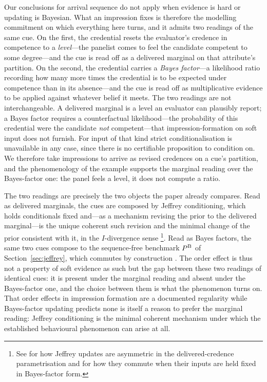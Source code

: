 Our conclusions for arrival sequence do not apply when evidence is hard or
updating is Bayesian. What an impression fixes is therefore the modelling
commitment on which everything here turns, and it admits two readings of the
same cue. On the first, the credential resets the evaluator's credence in
competence to a \emph{level}---the panelist comes to feel the candidate
competent to some degree---and the cue is read off as a delivered marginal on
that attribute's partition. On the second, the credential carries a
\emph{Bayes factor}---a likelihood ratio recording how many more times the
credential is to be expected under competence than in its absence---and the cue
is read off as multiplicative evidence to be applied against whatever belief it
meets. The two readings are not interchangeable. A delivered marginal is a
level an evaluator can plausibly report; a Bayes factor requires a counterfactual
likelihood---the probability of this credential were the candidate \emph{not}
competent---that impression-formation on soft input does not furnish. For input
of that kind strict conditionalisation is unavailable in any case, since there
is no certifiable proposition to condition on. We therefore take impressions to
arrive as revised credences on a cue's partition, and the phenomenology of the
example supports the marginal reading over the Bayes-factor one: the panel
feels a level, it does not compute a ratio.

The two readings are precisely the two objects the paper already compares. Read
as delivered marginals, the cues are composed by Jeffrey conditioning, which
holds conditionals fixed and---as a mechanism revising the prior to the
delivered marginal---is the unique coherent such revision and the minimal change
of the prior consistent with it, in the $I$-divergence sense
\citep{DiaconisZabell1982}\footnote{See \citet{Field1978} for how Jeffrey
updates are asymmetric in the delivered-credence parametrisation and
\citet{Wagner2002} for how they commute when their inputs are held fixed in
Bayes-factor form.}. Read as Bayes factors, the same two cues compose to the
sequence-free benchmark $P^{\mathrm{B}}$ of Section~\ref{sec:jeffrey}, which commutes by
construction \citep{Wagner2002}. The order effect is thus not a property of soft
evidence as such but the gap between these two readings of identical cues: it is
present under the marginal reading and absent under the Bayes-factor one, and
the choice between them is what the phenomenon turns on. That order effects in
impression formation are a documented regularity \citep{Asch1946,HogarthEinhorn1992}
while Bayes-factor updating predicts none \citep{Wagner2002} is itself a reason
to prefer the marginal reading: Jeffrey conditioning is the minimal coherent
mechanism under which the established behavioural phenomenon can arise at all.
